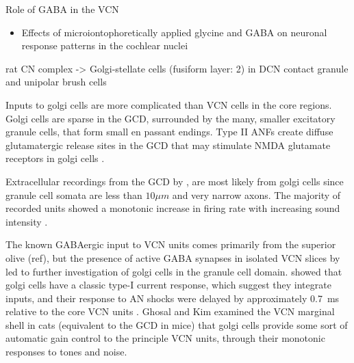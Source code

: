 \medskip{}

Role of GABA in the VCN
\begin{itemize}
\item Effects of microiontophoretically applied glycine and {GABA} on
  neuronal response patterns in the cochlear nuclei
  \citep{CasparyHaveyEtAl:1979}
\end{itemize}

\citep{Alibardi:2003a} rat CN complex -> Golgi-stellate cells
(fusiform layer: 2) in DCN contact granule and unipolar brush cells

\medskip{}

Inputs to golgi cells are more complicated than VCN cells in the core
regions. Golgi cells are sparse in the GCD, surrounded by the many,
smaller excitatory granule cells, that form small en passant
endings. Type II ANFs create diffuse glutamatergic release sites in
the GCD \citep{HurdHutsonEtAl:1999,BensonBrown:2004} that may
stimulate NMDA glutamate receptors in golgi cells
\citep{FerragamoGoldingEtAl:1998a}.

\medskip{}

Extracellular recordings from the GCD by \citet{GhoshalKim:1997}, are
most likely from golgi cells since granule cell somata are less than
$10{}\mu{m}$ and very narrow axons. The majority of recorded units
showed a monotonic increase in firing rate with increasing sound
intensity \citep{GhoshalKim:1997}.

\medskip{}

The known GABAergic input to VCN units comes primarily from the
superior olive (ref), but the presence of active GABA synapses in
isolated VCN slices by \citet{FerragamoGoldingEtAl:1998} led to
further investigation of golgi cells in the granule cell
domain. \citet{FerragamoGoldingEtAl:1998a} showed that golgi cells
have a classic type-I current response, which suggest they integrate
inputs, and their response to AN shocks were delayed by approximately
0.7~ms relative to the core VCN units .  Ghosal and Kim
\citet{GhoshalKim:1997} examined the VCN marginal shell in cats
(equivalent to the GCD in mice) that golgi cells provide some sort of
automatic gain control to the principle VCN units, through their
monotonic responses to tones and noise.

\medskip{}

   
